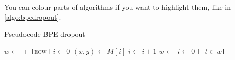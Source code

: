 You can colour parts of algorithms if you want to highlight them, like in \autoref{algo:bpedropout}.
\begin{algorithm}[H]
	\caption{Pseudocode BPE-dropout}
	\label{algo:bpedropout}
	\begin{algorithmic}[1]
			\State $w\gets$  + \texttt{[}\textsc{eow}\texttt{]}
			\State $i\gets 0$
				\State $(x,y) \gets M[i]$
				\State $i \gets i + 1$   %
					{\color{blue}
						\State $w \gets$ 
						\State $i \gets 0$
					\EndIf
					}
				\EndIf
			\EndWhile
			\Statey \Return \texttt{[} $\mid t \in w$\texttt{]}
		\EndFunction
	\end{algorithmic}
\end{algorithm}

\newpage

